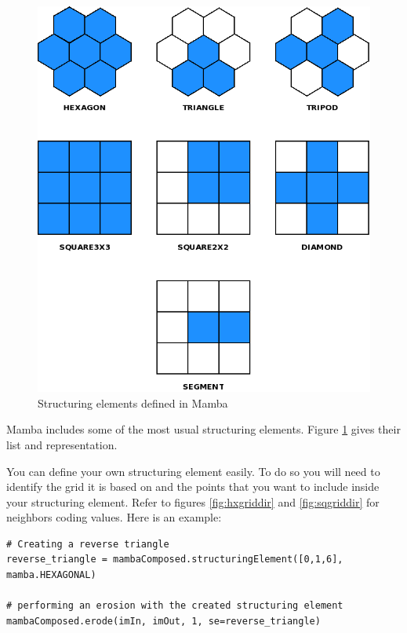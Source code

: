 \documentclass[a4paper,10pt,oneside]{article}
\begin{document}
\begin{figure}
\centering
\includegraphics[scale=0.3]{figures/se.png}
\caption{Structuring elements defined in Mamba}
\label{fig:se}
\end{figure}

Mamba includes some of the most usual structuring elements. Figure
\ref{fig:se} gives their list and representation.

You can define your own structuring element easily. To do so you will need to
identify the grid it is based on and the points that you want to include 
inside your structuring element. Refer to figures \ref{fig:hxgriddir} and 
\ref{fig:sqgriddir} for neighbors coding values. Here is an example:

\lstset{language=Python}
\begin{lstlisting}
# Creating a reverse triangle
reverse_triangle = mambaComposed.structuringElement([0,1,6], mamba.HEXAGONAL)

# performing an erosion with the created structuring element
mambaComposed.erode(imIn, imOut, 1, se=reverse_triangle)
\end{lstlisting}
\end{document}
